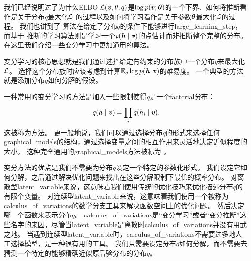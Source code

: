 我们已经说明过了为什么\gls{ELBO} $\mathcal{L}(\boldsymbol{\mathit{v}},\boldsymbol{\theta},q)$是$\log  p(\boldsymbol{\mathit{v}};\boldsymbol{\theta})$的一个下界、如何将推断看作是关于分布$q$最大化$\mathcal{L}$ 的过程以及如何将学习看作是关于参数$\boldsymbol{\theta}$最大化$\mathcal{L}$的过程。
我们也讲到了\,\,算法在给定了分布$q$的条件下能够进行\gls{large_learning_step}，而基于\,\,推断的学习算法则是学习一个$p(\boldsymbol{\mathit{h}} \mid \boldsymbol{\mathit{v}})$的点估计而非推断整个完整的分布。
在这里我们介绍一些变分学习中更加通用的算法。


变分学习的核心思想就是我们通过选择给定有约束的分布族中一个分布$q$来最大化$\mathcal{L}$。
选择这个分布族时应该考虑到计算$\mathbb{E}_q \log p(\boldsymbol{\mathit{h}},\boldsymbol{\mathit{v}})$的难易度。
一个典型的方法就是添加分布$q$如何分解的假设。


一种常用的变分学习的方法是加入一些限制使得$q$是一个\gls{factorial}分布：
\begin{align}
	q(\boldsymbol{\mathit{h}}\mid\boldsymbol{\mathit{v}}) = \prod_{i}^{}q(h_i \mid \boldsymbol{\mathit{v}}).
\end{align}
这被称为方法。
更一般地说，我们可以通过选择分布$q$的形式来选择任何\gls{graphical_models}的结构，通过选择变量之间的相互作用来灵活地决定近似程度的大小。
这种完全通用的\gls{graphical_models}方法被称为 \citep{Saul96}。


变分方法的优点是我们不需要为分布$q$设定一个特定的参数化形式。
我们设定它如何分解，之后通过解决优化问题来找出在这些分解限制下最优的概率分布。
对离散型\gls{latent_variable}来说，这意味着我们使用传统的优化技巧来优化描述分布$q$的有限个变量。
对连续型\gls{latent_variable}来说，这意味着我们使用一个被称为\gls{calculus_of_variations}的数学分支工具来解决函数空间上的优化问题。
然后决定哪一个函数来表示分布$q$。
\gls{calculus_of_variations}是``变分学习''或者``变分推断''这些名字的来因，尽管当\gls{latent_variable}是离散时\gls{calculus_of_variations}并没有用武之地。
当遇到连续型\gls{latent_variable}时，\gls{calculus_of_variations}不需要过多地人工选择模型，是一种很有用的工具。
我们只需要设定分布$q$如何分解，而不需要去猜测一个特定的能够精确近似原后验分布的分布$q$。


